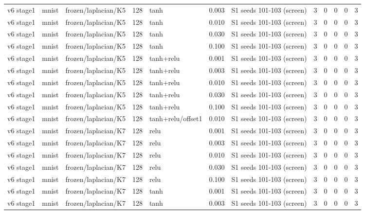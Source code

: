\begin{table}[htbp]
{\begin{tabular}{@{}lllrlrlrrrrr@{}}
v6 stage1 & mnist & frozen/laplacian/K5 & 128 & tanh & 0.003 & S1 seeds 101-103 (screen) & 3 & 0 & 0 & 0 & 3 \\
v6 stage1 & mnist & frozen/laplacian/K5 & 128 & tanh & 0.010 & S1 seeds 101-103 (screen) & 3 & 0 & 0 & 0 & 3 \\
v6 stage1 & mnist & frozen/laplacian/K5 & 128 & tanh & 0.030 & S1 seeds 101-103 (screen) & 3 & 0 & 0 & 0 & 3 \\
v6 stage1 & mnist & frozen/laplacian/K5 & 128 & tanh & 0.100 & S1 seeds 101-103 (screen) & 3 & 0 & 0 & 0 & 3 \\
v6 stage1 & mnist & frozen/laplacian/K5 & 128 & tanh+relu & 0.001 & S1 seeds 101-103 (screen) & 3 & 0 & 0 & 0 & 3 \\
v6 stage1 & mnist & frozen/laplacian/K5 & 128 & tanh+relu & 0.003 & S1 seeds 101-103 (screen) & 3 & 0 & 0 & 0 & 3 \\
v6 stage1 & mnist & frozen/laplacian/K5 & 128 & tanh+relu & 0.010 & S1 seeds 101-103 (screen) & 3 & 0 & 0 & 0 & 3 \\
v6 stage1 & mnist & frozen/laplacian/K5 & 128 & tanh+relu & 0.030 & S1 seeds 101-103 (screen) & 3 & 0 & 0 & 0 & 3 \\
v6 stage1 & mnist & frozen/laplacian/K5 & 128 & tanh+relu & 0.100 & S1 seeds 101-103 (screen) & 3 & 0 & 0 & 0 & 3 \\
v6 stage1 & mnist & frozen/laplacian/K5 & 128 & tanh+relu/offset1 & 0.010 & S1 seeds 101-103 (screen) & 3 & 0 & 0 & 0 & 3 \\
v6 stage1 & mnist & frozen/laplacian/K7 & 128 & relu & 0.001 & S1 seeds 101-103 (screen) & 3 & 0 & 0 & 0 & 3 \\
v6 stage1 & mnist & frozen/laplacian/K7 & 128 & relu & 0.003 & S1 seeds 101-103 (screen) & 3 & 0 & 0 & 0 & 3 \\
v6 stage1 & mnist & frozen/laplacian/K7 & 128 & relu & 0.010 & S1 seeds 101-103 (screen) & 3 & 0 & 0 & 0 & 3 \\
v6 stage1 & mnist & frozen/laplacian/K7 & 128 & relu & 0.030 & S1 seeds 101-103 (screen) & 3 & 0 & 0 & 0 & 3 \\
v6 stage1 & mnist & frozen/laplacian/K7 & 128 & relu & 0.100 & S1 seeds 101-103 (screen) & 3 & 0 & 0 & 0 & 3 \\
v6 stage1 & mnist & frozen/laplacian/K7 & 128 & tanh & 0.001 & S1 seeds 101-103 (screen) & 3 & 0 & 0 & 0 & 3 \\
v6 stage1 & mnist & frozen/laplacian/K7 & 128 & tanh & 0.003 & S1 seeds 101-103 (screen) & 3 & 0 & 0 & 0 & 3 \\

\end{tabular}}
\end{table}
